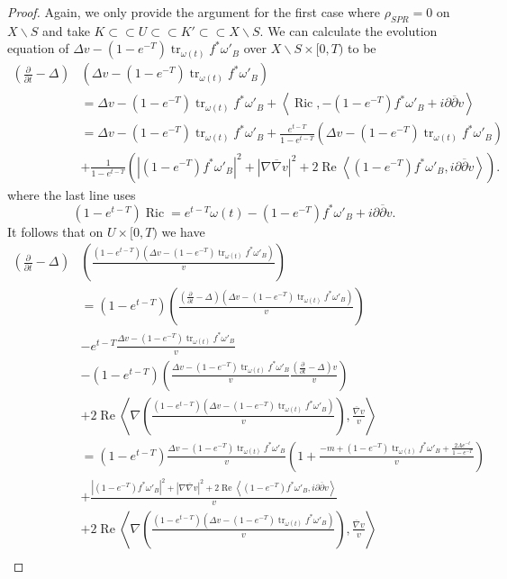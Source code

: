 \documentclass[10pt,a4paper]{amsart}
\DeclareMathOperator{\Real}{Re}
\DeclareMathOperator{\Ric}{Ric}
\DeclareMathOperator{\tr}{tr}
\newcommand{\dbar}{\overline{\partial}}
\newcommand{\ip}[1]{\left\langle#1\right\rangle}
\newcommand{\oo}[1]{\overline{#1}}
\newcommand{\parabolic}[1]{\left(\frac{\d}{\d t} - \Delta_{#1}\right)}
\renewcommand{\d}{\partial}
\begin{document}
\begin{proof}
Again, we only provide the argument for the first case where $\rho_{SPR} = 0$ on $X \backslash S$ and take $K \subset \subset U \subset \subset K' \subset \subset X \backslash S$. We can calculate the evolution equation of $\Delta v - (1-e^{-T})\tr_{\omega(t)} f^*\omega'_B$ over $X \backslash S \times [0,T)$ to be 
\begin{align*}
    \parabolic{}&(\Delta v - (1-e^{-T})\tr_{\omega(t)} f^*\omega'_B)\\ &= \Delta v - (1-e^{-T})\tr_{\omega(t)}f^*\omega'_B+ \ip{\Ric, -(1-e^{-T})f^* \omega'_B + i\d\dbar v}\\
    &= \Delta v - (1-e^{-T})\tr_{\omega(t)} f^*\omega'_B+\frac{e^{t-T}}{1-e^{t-T}} (\Delta v - (1-e^{-T})\tr_{\omega(t)} f^*\omega'_B )\\
    &+ \frac{1}{1-e^{t-T}}\left(|(1-e^{-T})f^*\omega'_B|^2 + |\nabla \oo{\nabla} v|^2 + 2 \Real \ip{(1-e^{-T})f^*\omega'_B, i\d\dbar v }\right).
\end{align*}
where the last line uses
\begin{equation*}
    (1-e^{t-T}) \Ric = e^{t-T} \omega(t) - (1-e^{-T})f^*\omega'_B + i\d\dbar v.
\end{equation*}
It follows that on $U \times [0,T)$ we have 
\begin{align*}
    \parabolic{} &\left(\frac{(1-e^{t-T})(\Delta v - (1-e^{-T})\tr_{\omega(t)} f^*\omega'_B)}{v}\right)\\
    &= (1-e^{t-T}) \left(\frac{\parabolic{} (\Delta v - (1-e^{-T})\tr_{\omega(t)} f^*\omega'_B)}{v}\right)\\
    &-e^{t-T} \frac{\Delta v - (1-e^{-T}) \tr_{\omega(t)}f^*\omega'_B}{ v}\\
    &- (1-e^{t-T})\left(\frac{\Delta v - (1-e^{-T})\tr_{\omega(t)} f^*\omega'_B}{v} \frac{\parabolic{} v}{v}\right)\\
    &+ 2\Real \ip{\nabla \left(\frac{(1-e^{t-T})(\Delta v - (1-e^{-T})\tr_{\omega(t)} f^*\omega'_B)}{v}\right), \frac{\oo{\nabla} v}{v}}\\
    &= (1-e^{t-T}) \frac{\Delta v - (1-e^{-T})\tr_{\omega(t)} f^*\omega'_B}{v} \left(1+\frac{-m+(1-e^{-T})\tr_{\omega(t)}f^*\omega'_B + \frac{2A e^{-t}}{1-e^{-T}}}{v}\right)\\
    &+\frac{|(1-e^{-T})f^*\omega'_B|^2 + |\nabla \oo{\nabla} v|^2 + 2 \Real \ip{(1-e^{-T})f^*\omega'_B, i\d\dbar v }}{v}\\
    &+ 2\Real \ip{\nabla \left(\frac{(1-e^{t-T})(\Delta v - (1-e^{-T})\tr_{\omega(t)} f^*\omega'_B)}{v}\right), \frac{\oo{\nabla} v}{v}}\\

\end{align*}
\end{proof}
\end{document}
